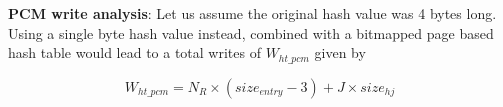 \textbf{PCM write analysis}: Let us assume the original hash value was 4 bytes long. Using a single byte hash value instead, combined with a bitmapped page based hash table would lead to a total writes of $W_{ht\_pcm}$ given by

\begin{equation}\label{eq:ht_pcm}
W_{ht\_pcm} = N_R \times (size_{entry} - 3)+ J \times size_{hj}
\end{equation}
	
